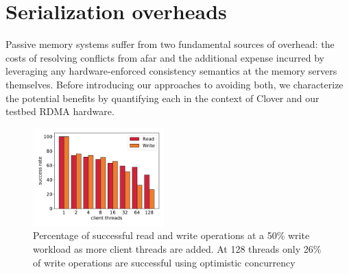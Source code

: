 \section{Serialization overheads}




Passive memory systems suffer from two fundamental sources of overhead:
the costs of resolving conflicts from afar and the additional expense
incurred by leveraging any hardware-enforced consistency semantics at
the memory servers themselves.  Before introducing our approaches to
avoiding both, we characterize the potential benefits by quantifying
each in the context of Clover and our testbed RDMA hardware.




\begin{figure}[t]
    \includegraphics[width=0.45\textwidth]{fig/success_rate.pdf}
    
    \caption{Percentage of successful read and write operations at a 50\% write
    workload as more client threads are added. At 128 threads only 26\% of write
    operations are successful using optimistic concurrency}

    \label{fig:success_rate}
\end{figure}

